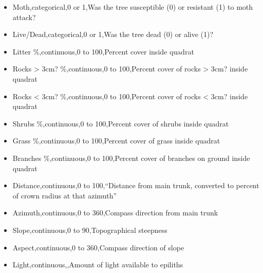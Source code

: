 \documentclass[]{article}
\providecommand{\tightlist}{%
  \setlength{\itemsep}{0pt}\setlength{\parskip}{0pt}}
\begin{document}
\begin{itemize}
\tightlist
\item
  Moth,categorical,0 or 1,Was the tree susceptible (0) or resistant (1)
  to moth attack?
\item
  Live/Dead,categorical,0 or 1,Was the tree dead (0) or alive (1)?
\item
  Litter \%,continuous,0 to 100,Percent cover inside quadrat
\item
  Rocks \textgreater{} 3cm? \%,continuous,0 to 100,Percent cover of
  rocks \textgreater{} 3cm? inside quadrat
\item
  Rocks \textless{} 3cm? \%,continuous,0 to 100,Percent cover of rocks
  \textless{} 3cm? inside quadrat
\item
  Shrubs \%,continuous,0 to 100,Percent cover of shrubs inside quadrat
\item
  Grass \%,continuous,0 to 100,Percent cover of grass inside quadrat
\item
  Branches \%,continuous,0 to 100,Percent cover of branches on ground
  inside quadrat
\item
  Distance,continuous,0 to 100,``Distance from main trunk, converted to
  percent of crown radius at that azimuth''
\item
  Azimuth,continuous,0 to 360,Compass direction from main trunk
\item
  Slope,continuous,0 to 90,Topographical steepness
\item
  Aspect,continuous,0 to 360,Compass direction of slope
\item
  Light,continuous,,Amount of light available to epiliths
\end{itemize}
\end{document}
